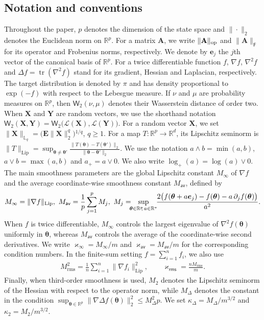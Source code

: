 \documentclass[aos,reqno]{imsart}
\newcommand\bY{\boldsymbol Y}
\newcommand\bX{\boldsymbol X}
\newcommand\bse{\boldsymbol e}
\newcommand\bfA{\mathbf A}
\DeclareMathOperator{\tr}{tr}
\newcommand\btheta{\boldsymbol\theta}
\def\wass{\mathsf{W}}
\def\kappav{\varkappa_{\textsf{av}}}
\def\kappamax{\varkappa_{\infty}}
\def\kapparms{\varkappa_{\textsf{rms}}}
\def\Mav{M_{\textsf{av}}}
\def\Mmax{M_{\infty}}
\def\Mtwo{M_{\mathrm{rms}}}
\theoremstyle{definition}
\begin{document}
\subsection{Notation and conventions}\label{ssec:notation}

Throughout the paper, $p$ denotes the dimension of the
state space and $\|\cdot\|_2$ denotes the Euclidean norm
on $\mathbb R^p$. For a matrix $\bfA$, we write
$\|\bfA\|_{\rm op}$ and $\|\bfA\|_{\mathsf F}$ for its
operator and Frobenius norms, respectively. We denote by
$\bse_j$ the $j$th vector of the canonical basis of
$\mathbb R^p$. For a twice differentiable function $f$,
$\nabla f$, $\nabla^2 f$ and $\Delta f = \tr(\nabla^2 f)$
stand for its gradient, Hessian and Laplacian, respectively. 
The target distribution is denoted by $\pi$ and has
density proportional to $\exp(-f)$ with respect to the
Lebesgue measure. If $\nu$ and $\mu$ are probability 
measures on $\mathbb R^p$, then $\wass_2(\nu,\mu)$ 
denotes their Wasserstein distance of order two. When 
$\bX$ and $\bY$ are random vectors, we use the shorthand 
notation $\wass_2(\bX,\bY) = \wass_2\big(\mathcal L(\bX)
,\mathcal L(\bY)\big)$. For a random vector $\bX$, we 
set $\|\bX\|_{\mathbb L_q} = \big(\mathbf E\|\bX\|_2^q 
\big){}^{1/q}$, $q\geqslant 1$. For a map $T:\mathbb R^p
\to\mathbb R^d$, its Lipschitz seminorm is  $\|T\|_{
\mathrm{Lip}} = \sup_{\btheta\neq\btheta'} \frac{\| 
T(\btheta)-T(\btheta')\|_2}{\|\btheta-\btheta'\|_2}$.
We use the notation $a\wedge b=\min(a,b)$,
$a\vee b=\max(a,b)$ and $a_+=a\vee0$. We also write
$\log_+(a)=\log(a)\vee0$. The main smoothness parameters 
are the global Lipschitz constant $\Mmax$ of $\nabla f$ 
and the average coordinate-wise smoothness constant 
$\Mav$, defined by
\begin{align}\label{coordM}
    \Mmax = \|\nabla f\|_{\rm Lip},\  
    \Mav = \frac1p\sum_{j=1}^p M_j,
    \ 
    M_j
    =\!\!\!
    \sup_{\btheta\in\mathbb R^p\!\!,\,a\in\mathbb R^*}
    \!\!\frac{2\big(f(\btheta+a\bse_j)-f(\btheta)
    -a\,\partial_j f(\btheta)\big)}{a^2}.
\end{align}
When $f$ is twice differentiable, $\Mmax$ controls the
largest eigenvalue of $\nabla^2 f(\btheta)$ uniformly in
$\btheta$, whereas $\Mav$ controls the average of the
coordinate-wise second derivatives. We write
$\kappamax = {\Mmax}/{m}$ and $\kappav = {\Mav}/{m}$ 
for the corresponding condition numbers. In the 
finite-sum setting $f=\sum_{i=1}^n f_i$, we also use
\begin{align}\label{eq:Mtwo}
    \Mtwo^2
    =
    \frac1n\sum_{i=1}^n
    \|\nabla f_i\|_{\mathrm{Lip}}^2,
    \qquad
    \kapparms
    =
    \frac{n\Mtwo}{m}.
\end{align}
Finally, when third-order smoothness is used, $M_2$ 
denotes the Lipschitz
seminorm of the Hessian with respect to the
operator norm, while $M_\Delta$ denotes the constant in
the condition $\sup_{\btheta\in\mathbb R^p} \|\nabla
\Delta f(\btheta) \|_2^2 \leqslant M_\Delta^2 p$. We set $\kappa_\Delta =
M_\Delta/m^{3/2}$ and $\kappa_2 = M_2/m^{3/2}$. 
\end{document}
